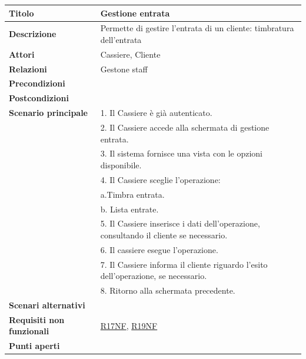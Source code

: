\documentclass[a4paper]{article}
\begin{document}
\begin{center}
\begin{tabularx}{1\textwidth}{|l|X|}
    \hline
	\textbf{Titolo} & Gestione entrata \\
	\hline
	\textbf{Descrizione} & Permette di gestire l'entrata di un cliente: timbratura dell'entrata \\
	\hline
	\textbf{Attori} & Cassiere, Cliente \\
	\hline
	\textbf{Relazioni} & Gestone staff \\
	\hline
	\textbf{Precondizioni} &  \\
	\hline
	\textbf{Postcondizioni} &  \\
	\hline
	\textbf{Scenario principale} & 1. Il Cassiere è già autenticato.\\
	                             & 2. Il Cassiere accede alla schermata di gestione entrata. \\
								 & 3. Il sistema fornisce una vista con le opzioni disponibile.\\
								 & 4. Il Cassiere sceglie l'operazione:\\
								 & \quad a.Timbra entrata.\\
								 & \quad b. Lista entrate.\\
								 & 5. Il Cassiere inserisce i dati dell'operazione, consultando il cliente se necessario.\\
								 & 6. Il cassiere esegue l'operazione.\\
								 & 7. Il Cassiere informa il cliente riguardo l'esito dell'operazione, se necessario.\\
								 & 8. Ritorno alla schermata precedente.\\
	\hline
	\textbf{Scenari alternativi} & \\
	\hline
	\textbf{Requisiti non funzionali} & \hyperlink{R17NF}{R17NF}, \hyperlink{R19NF}{R19NF} \\
	\hline
	\textbf{Punti aperti} & \\
	\hline
\end{tabularx}
\end{center}


\end{document}
